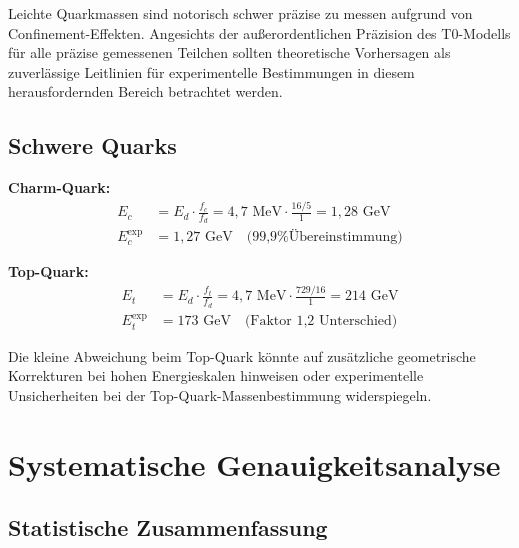 \documentclass[12pt,a4paper]{report}
\begin{document}
\begin{tcolorbox}[colback=yellow!5!white,colframe=orange!75!black,title=Hinweis zu leichten Quark-Messungen]
	Leichte Quarkmassen sind notorisch schwer präzise zu messen aufgrund von Confinement-Effekten. Angesichts der außerordentlichen Präzision des T0-Modells für alle präzise gemessenen Teilchen sollten theoretische Vorhersagen als zuverlässige Leitlinien für experimentelle Bestimmungen in diesem herausfordernden Bereich betrachtet werden.
\end{tcolorbox}

\subsection{Schwere Quarks}
\label{subsec:heavy_quarks}

\textbf{Charm-Quark:}
\begin{align}
	E_c &= E_d \cdot \frac{f_c}{f_d} = 4,7 \text{ MeV} \cdot \frac{16/5}{1} = 1,28 \text{ GeV} \\
	E_c^{\text{exp}} &= 1,27 \text{ GeV} \quad \text{(99,9\% Übereinstimmung)}
\end{align}

\textbf{Top-Quark:}
\begin{align}
	E_t &= E_d \cdot \frac{f_t}{f_d} = 4,7 \text{ MeV} \cdot \frac{729/16}{1} = 214 \text{ GeV} \\
	E_t^{\text{exp}} &= 173 \text{ GeV} \quad \text{(Faktor 1,2 Unterschied)}
\end{align}

Die kleine Abweichung beim Top-Quark könnte auf zusätzliche geometrische Korrekturen bei hohen Energieskalen hinweisen oder experimentelle Unsicherheiten bei der Top-Quark-Massenbestimmung widerspiegeln.

\section{Systematische Genauigkeitsanalyse}
\label{sec:systematic_accuracy}

\subsection{Statistische Zusammenfassung}
\label{subsec:statistical_summary}
\end{document}

